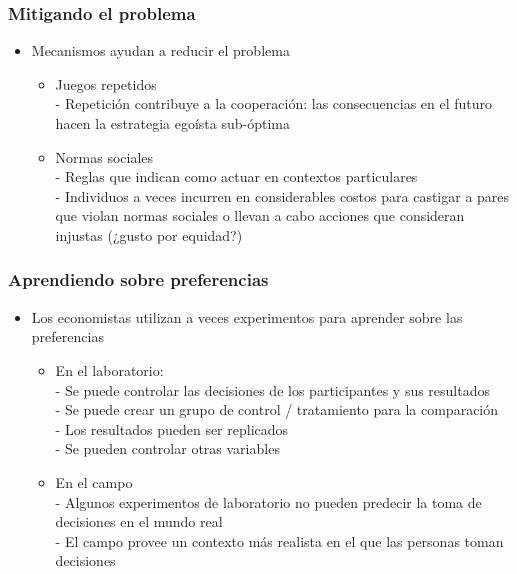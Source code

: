 \documentclass{beamer}
\begin{document}
\begin{frame}
\frametitle{ Mitigando el problema}
\begin{itemize}
    \item Mecanismos ayudan a reducir el problema
    \begin{itemize}
        \item Juegos repetidos \\
        - Repetición contribuye a la cooperación: las consecuencias en el futuro hacen la estrategia egoísta sub-óptima
        \item Normas sociales \\
        - Reglas que indican como actuar en contextos particulares \\
        - Individuos a veces incurren en considerables costos para castigar a pares que violan normas sociales o llevan a cabo acciones que consideran injustas (¿gusto por equidad?)
    \end{itemize}
\end{itemize}
\end{frame}

\begin{frame}
\frametitle{ Aprendiendo sobre preferencias}
\begin{itemize}
    \item Los economistas utilizan a veces experimentos para aprender sobre las preferencias
    \begin{itemize}
        \item En el laboratorio: \\
        - Se puede controlar las decisiones de los participantes y sus resultados \\
        - Se puede crear un grupo de control / tratamiento para la comparación \\
        - Los resultados pueden ser replicados \\
        - Se pueden controlar otras variables
        \item En el campo \\
        - Algunos experimentos de laboratorio no pueden predecir la toma de decisiones en el mundo real \\
        - El campo provee un contexto más realista en el que las personas toman decisiones
    \end{itemize}
\end{itemize}
\end{frame}
\end{document}
